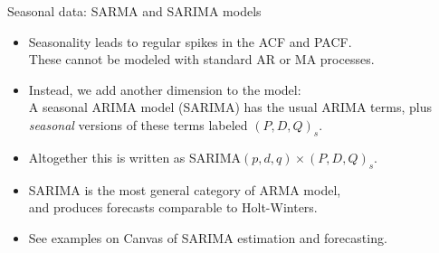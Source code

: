 \documentclass[t,12pt]{beamer}
\begin{document}
\begin{frame}[c]{Seasonal data: SARMA and SARIMA models}
\begin{itemize}
\item
Seasonality leads to regular spikes in the ACF and PACF.
\\ These cannot be modeled with standard AR or MA processes.
\medskip
\item
Instead, we add another dimension to the model:
\\ A seasonal ARIMA model (SARIMA) has the usual ARIMA terms,
plus \emph{seasonal} versions of these terms labeled $(P,D,Q)_s$.
\medskip
\item
Altogether this is written as SARIMA$(p,d,q)\times(P,D,Q)_s$.
\medskip
\item SARIMA is the most general category of ARMA model,
\\ and produces forecasts comparable to Holt-Winters.
\medskip
\item See examples on Canvas of SARIMA estimation and forecasting.
\end{itemize}
\end{frame}
\end{document}
